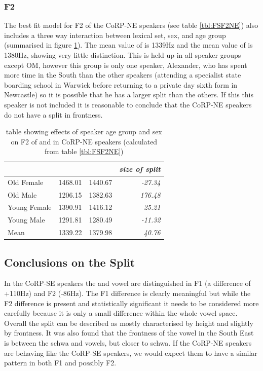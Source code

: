\documentclass[../../../00.FullDoc/tex/ThesisSkeleton-draft2]{subfiles}
\begin{document}
\subsubsection{F2} \label{subsubsec:NEF2}
The best fit model for F2 of the CoRP-NE speakers (see table \ref{tbl:FSF2NE}) also includes a three way interaction between lexical set, sex, and age group (summarised in figure \ref{tbl:FSF2NEinter}). The mean value of \foot{} is 1339Hz and the mean value of \strutt{} is 1380Hz, showing very little distinction. This is held up in all speaker groups except OM, however this group is only one speaker, Alexander, who has spent more time in the South than the other speakers (attending a specialist state boarding school in Warwick before returning to a private day sixth form in Newcastle) so it is possible that he has a larger split than the others. If this this speaker is not included it is reasonable to conclude that the CoRP-NE speakers do not have a \FS{} split in frontness.



\begin{table}[htbp]
	\centering
	\begin{tabular}{lrrr}
		\hline
		& \multicolumn{1}{l}{\foot{}} & \multicolumn{1}{l}{\strutt{}} & \multicolumn{1}{l}{\textit{size of split}} \\
		\hline
		Old Female & 1468.01 & 1440.67 & \textit{-27.34} \\
		Old Male & 1206.15 & 1382.63 & \textit{176.48} \\
		Young Female & 1390.91 & 1416.12 & \textit{25.21} \\
		Young Male & 1291.81 & 1280.49 & \textit{-11.32} \\
		Mean  & 1339.22 & 1379.98 & \textit{40.76} \\
		\hline
	\end{tabular}%
	\caption{table showing effects of speaker age group and sex on F2 of \foot{} and \strutt{} in CoRP-NE speakers (calculated from table \ref{tbl:FSF2NE})}
	\label{tbl:FSF2NEinter}
	\end{table}%


\subsection{Conclusions on the Split}
In the CoRP-SE speakers the \foot{} and \strutt{} vowel are distinguished in F1 (a difference of +110Hz) and F2 (-86Hz). The F1 difference is clearly meaningful but while the F2 difference is present and statistically significant it needs to be considered more carefully because it is only a small difference within the whole vowel space. Overall the \FS split can be described as mostly characterised by height and slightly by frontness. It was also found that the frontness of the \strutt{} vowel in the South East is between the schwa and  vowels, but closer to schwa. If the CoRP-NE speakers are behaving like the CoRP-SE speakers, we would expect them to have a similar pattern in both F1 and possibly F2.
\end{document}
